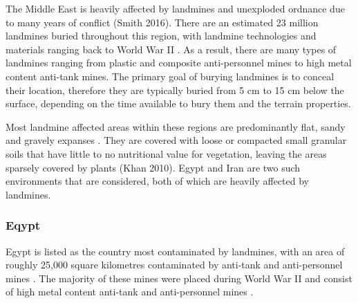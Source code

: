 \documentclass[main.tex]{subfiles}
\begin{document}
The Middle East is heavily affected by landmines and unexploded ordnance due to many years of conflict (Smith 2016). There are an estimated 23 million landmines buried throughout this region, with landmine technologies and materials ranging back to World War II \parencite{Khamis13}. As a result, there are many types of landmines ranging from plastic and composite anti-personnel mines to high metal content anti-tank mines. The primary goal of burying landmines is to conceal their location, therefore they are typically buried from 5 cm to 15 cm below the surface, depending on the time available to bury them and the terrain properties.

Most landmine affected areas within these regions are predominantly flat, sandy and gravely expanses \parencite{Nahrawy2011}. They are covered with loose or compacted small granular soils that have little to no nutritional value for vegetation, leaving the areas sparsely covered by plants (Khan 2010).  
Egypt and Iran are two such environments that are considered, both of which are heavily affected by landmines.  %

\subsubsection{Eqypt}


Egypt is listed as the country most contaminated by landmines, with an area of roughly 25,000 square kilometres contaminated by anti-tank and anti-personnel mines \parencite{Rushfan2008}. The majority of these mines were placed during World War II and consist of high metal content anti-tank and anti-personnel mines \parencite{Khamis13}. %
\end{document}
